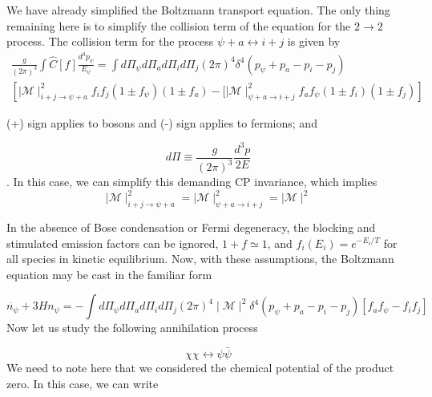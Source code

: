 \documentclass[12pt]{report}
\begin{document}
We have already simplified the Boltzmann transport equation. The only thing remaining here is to simplify the collision term of the equation for the $2 \rightarrow 2$ process. The collision term for the process $\psi+a \longleftrightarrow i + j$ is given by \cite{kolbbook}
\begin{multline*}
 \frac{g}{(2 \pi)^3} \int \hat{C}[f] \frac{d^3 p_\psi}{E_\psi} = \int d \Pi_\psi d \Pi_a d \Pi_i d \Pi_j (2 \pi)^4 \delta^4(p_\psi + p_a - p_i - p_j)\\
 \left[\mid \mathcal{M}\mid ^2_{i+j \rightarrow \psi+a} f_i f_j (1 \pm f_\psi)(1 \pm f_a)-[\mid \mathcal{M}\mid ^2_{\psi+a \rightarrow i+j} f_a f_\psi (1 \pm f_i)(1 \pm f_j) \right]
\end{multline*} \label{b2}

(+) sign applies to bosons and (-) sign applies to fermions; and 

$$d \Pi \equiv \frac{g}{(2 \pi)^3} \frac{d^3p}{2E}$$.
In this case, we can simplify this demanding CP invariance, which implies 
$$\mid \mathcal{M}\mid ^2_{i+j \rightarrow \psi+a}= \mid \mathcal{M}\mid ^2_{\psi+a \rightarrow i+j}=\mid \mathcal{M} \mid^2 $$

In the absence of Bose condensation or Fermi degeneracy, the blocking and stimulated emission factors can be ignored, $1+f \simeq 1$, and $f_i (E_i) = e^{-E_i/T}$ for all species in kinetic equilibrium. Now, with these assumptions, the Boltzmann equation may be cast in the familiar form

$$\dot{n_\psi}+3 H n_\psi=-\int d \Pi_\psi d \Pi_a d \Pi_i d \Pi_j (2 \pi)^4 \mid \mathcal{M} \mid^2 \delta^4(p_\psi + p_a - p_i - p_j) [f_a f_\psi- f_i f_j]$$
Now let us study the following annihilation process

$$\chi \chi \longleftrightarrow \psi \bar{\psi} $$
We need to note here that we considered the chemical potential of the product zero. In this case, we can write
\end{document}
